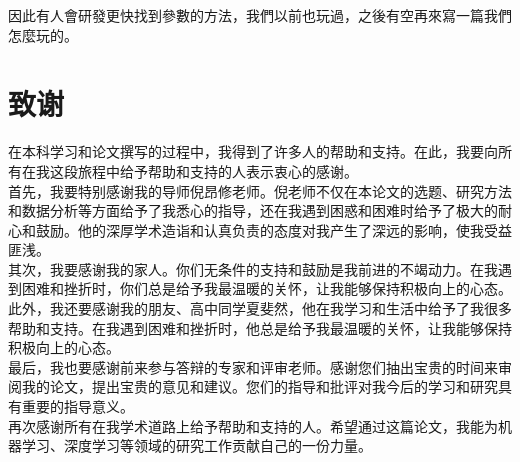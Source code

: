 \documentclass[12pt,a4paper]{amsart}
\begin{document}
因此有人會研發更快找到參數的方法，我們以前也玩過，之後有空再來寫一篇我們怎麼玩的。

\section{致谢}

在本科学习和论文撰写的过程中，我得到了许多人的帮助和支持。在此，我要向所有在我这段旅程中给予帮助和支持的人表示衷心的感谢。\\

首先，我要特别感谢我的导师倪昂修老师。倪老师不仅在本论文的选题、研究方法和数据分析等方面给予了我悉心的指导，还在我遇到困惑和困难时给予了极大的耐心和鼓励。他的深厚学术造诣和认真负责的态度对我产生了深远的影响，使我受益匪浅。\\

其次，我要感谢我的家人。你们无条件的支持和鼓励是我前进的不竭动力。在我遇到困难和挫折时，你们总是给予我最温暖的关怀，让我能够保持积极向上的心态。\\

此外，我还要感谢我的朋友、高中同学夏斐然，他在我学习和生活中给予了我很多帮助和支持。在我遇到困难和挫折时，他总是给予我最温暖的关怀，让我能够保持积极向上的心态。\\

最后，我也要感谢前来参与答辩的专家和评审老师。感谢您们抽出宝贵的时间来审阅我的论文，提出宝贵的意见和建议。您们的指导和批评对我今后的学习和研究具有重要的指导意义。\\

再次感谢所有在我学术道路上给予帮助和支持的人。希望通过这篇论文，我能为机器学习、深度学习等领域的研究工作贡献自己的一份力量。

\appendix

{\footnotesize}
\end{document}
